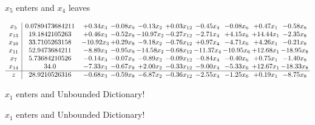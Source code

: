 \documentclass[9pt]{article}
\begin{document}
 $ x_{5} $ enters and $ x_{4} $ leaves 

 \[\begin{array}{c| c c@{\hskip 2pt} c@{\hskip 2pt} c@{\hskip 2pt} c@{\hskip 2pt} c@{\hskip 2pt} c@{\hskip 2pt} c@{\hskip 2pt} c@{\hskip 2pt} }
 x_{5}   &  0.0789473684211 & +  0.34 x_{3} & -0.08 x_{9} & -0.13 x_{2} & +  0.03 x_{12} & -0.45 x_{4} & -0.08 x_{6} & +  0.47 x_{1} & -0.58 x_{8}\\
 x_{13}   &  19.1842105263 & +  0.46 x_{3} & -0.52 x_{9} & -10.97 x_{2} & -0.27 x_{12} & -2.71 x_{4} & +  4.15 x_{6} & + 14.44 x_{1} & -2.35 x_{8}\\
 x_{10}   &  33.7105263158 & -10.92 x_{3} & +  0.29 x_{9} & -9.18 x_{2} & -0.76 x_{12} & +  0.97 x_{4} & -4.71 x_{6} & +  4.26 x_{1} & -0.21 x_{8}\\
 x_{11}   &  52.9473684211 & -8.89 x_{3} & -0.95 x_{9} & -14.58 x_{2} & -0.68 x_{12} & -11.37 x_{4} & -10.95 x_{6} & + 12.68 x_{1} & -18.95 x_{8}\\
 x_{7}   &  5.73684210526 & -0.14 x_{3} & -0.07 x_{9} & -0.89 x_{2} & -0.09 x_{12} & -0.84 x_{4} & -0.40 x_{6} & +  0.75 x_{1} & -1.40 x_{8}\\
 x_{14}   &  34.0 & -7.33 x_{3} & -0.67 x_{9} & +  2.00 x_{2} & -0.33 x_{12} & -9.00 x_{4} & -5.33 x_{6} & + 12.67 x_{1} & -18.33 x_{8}\\
\hline
z    &  28.9210526316 & -0.68 x_{3} & -0.59 x_{9} & -6.87 x_{2} & -0.36 x_{12} & -2.55 x_{4} & -1.25 x_{6} & +  0.19 x_{1} & -8.75 x_{8}\\
\end{array}\]


 $ x_{1} $ enters and Unbounded Dictionary!


 $ x_{1} $ enters and Unbounded Dictionary!
\end{document}
